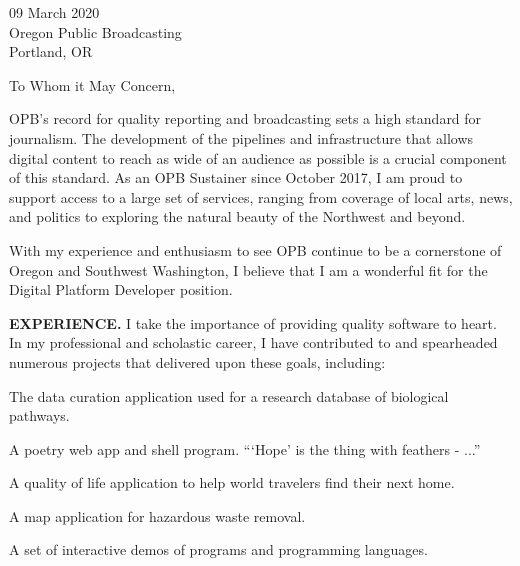 



\textcolor{my-grey}{\dotfill}
\bigbreak


09 March 2020\\
Oregon Public Broadcasting\\
Portland, OR

\vspace*{2\baselineskip}

To Whom it May Concern,

\vspace*{2\baselineskip}

OPB's record for quality reporting and broadcasting sets a high standard for journalism. The development of the pipelines and infrastructure that allows digital content to reach as wide of an audience as possible is a crucial component of this standard. As an OPB Sustainer since October 2017, I am proud to support access to a large set of services, ranging from coverage of local arts, news, and politics to exploring the natural beauty of the Northwest and beyond.

\vspace*{\baselineskip}

With my experience and enthusiasm to see OPB continue to be a cornerstone of Oregon and Southwest Washington, I believe that I am a wonderful fit for the Digital Platform Developer position.

\vspace*{\baselineskip}

\textbf{EXPERIENCE.} I take the importance of providing quality software to heart. In my professional and scholastic career, I have contributed to and spearheaded numerous projects that delivered upon these goals, including:

\begin{itemize}[label=$\triangleright$]
The data curation application used for a research database of biological pathways.

A poetry web app and shell program. ```Hope' is the thing with feathers - ...''

A quality of life application to help world travelers find their next home.

A map application for hazardous waste removal.

A set of interactive demos of programs and programming languages.

\end{itemize}

